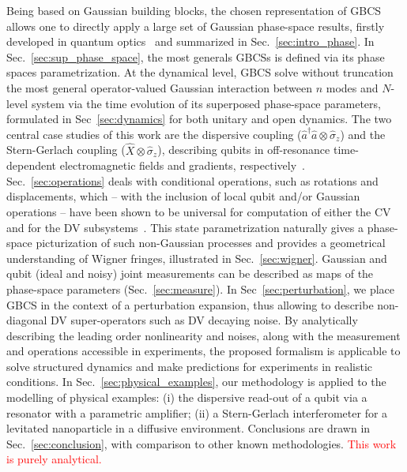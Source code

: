 \documentclass[%
reprint,
superscriptaddress,
nofootinbib,
 amsmath,amssymb,
prx,
floatfix,
]{revtex4-2}
\begin{document}
Being based on Gaussian building blocks, the chosen representation of GBCS allows one to directly apply a large set of 
Gaussian phase-space results, firstly developed in quantum optics~\cite{serafini_quantum_2017} and summarized in Sec.~\ref{sec:intro_phase}. In Sec.~\ref{sec:sup_phase_space}, the most generals GBCSs is defined via its phase spaces parametrization. At the dynamical level, GBCS solve without truncation the most general operator-valued Gaussian interaction between $n$ modes and $N$-level system via the time evolution of its superposed phase-space parameters, formulated in Sec~\ref{sec:dynamics} for both unitary and open dynamics. The two central case studies of this work are the dispersive coupling ($\hat{a}^{\dag} \hat{a} \otimes \hat{\sigma}_z$) and the Stern-Gerlach coupling ($\hat{X} \otimes \hat{\sigma}_z$), describing qubits in off-resonance time-dependent electromagnetic fields and gradients, respectively~\cite{xiang_hybrid_2013}.  Sec.~\ref{sec:operations} deals with conditional operations, such as rotations and displacements, which -- with the inclusion of local qubit and/or Gaussian operations -- have been shown to be universal for computation of either the CV and for the DV subsystems~\cite{Hybrid_loock_2008,krastanov_universal_2015,Heeres_Implementing_2017,Eickbusch_fast_2022,grosso_controlled_2025}. This state parametrization naturally gives a phase-space picturization of such non-Gaussian processes and provides a geometrical understanding of Wigner fringes,  illustrated in Sec.~\ref{sec:wigner}.  
Gaussian and qubit (ideal and noisy) joint measurements can be described as maps of the phase-space parameters (Sec.~\ref{sec:measure}). In Sec~\ref{sec:perturbation}, we place GBCS in the context of a perturbation expansion, thus allowing to describe non-diagonal DV super-operators such as DV decaying noise. By analytically describing the leading order nonlinearity and noises, along with the measurement and operations accessible in experiments, the proposed formalism is applicable to solve structured dynamics and make predictions for experiments in realistic conditions. In Sec.~\ref{sec:physical_examples}, our methodology is applied to the modelling of physical examples: (i) the dispersive read-out of a qubit via a resonator with a parametric amplifier; (ii) a Stern-Gerlach interferometer for a levitated nanoparticle in a diffusive environment. Conclusions are drawn in Sec.~\ref{sec:conclusion}, with comparison to other known methodologies. \textcolor{red}{This work is purely analytical. }
\end{document}
